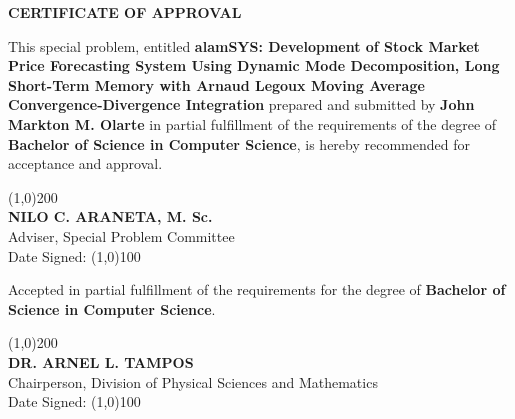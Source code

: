 \begin{titlepage}
    \centering
    \textbf{CERTIFICATE OF APPROVAL}

    \begin{justify}
        \qquad This special problem, entitled \textbf{alamSYS: Development of Stock Market Price Forecasting System Using Dynamic Mode Decomposition, Long Short-Term Memory with Arnaud Legoux Moving Average Convergence-Divergence Integration}
        prepared and submitted by \textbf{John Markton M. Olarte} in partial fulfillment of the requirements of the degree
        of \textbf{Bachelor of Science in Computer Science}, is hereby recommended for acceptance and approval.
    \end{justify}
    \hfill


    \begin{table}[h!]
    \end{table}
    \hfill

    \centering
    \line(1,0){200}\\
    \textbf{NILO C. ARANETA, M. Sc.}\\
    Adviser, Special Problem Committee\\
    Date Signed: \line(1,0){100}

    \begin{justify}
        \qquad Accepted in partial fulfillment of the requirements for the degree of \textbf{Bachelor of Science in Computer Science}.
    \end{justify}

    \centering
    \line(1,0){200}\\
    \textbf{DR. ARNEL L. TAMPOS}\\
    Chairperson, Division of Physical Sciences and Mathematics\\
    Date Signed: \line(1,0){100}

\end{titlepage}



